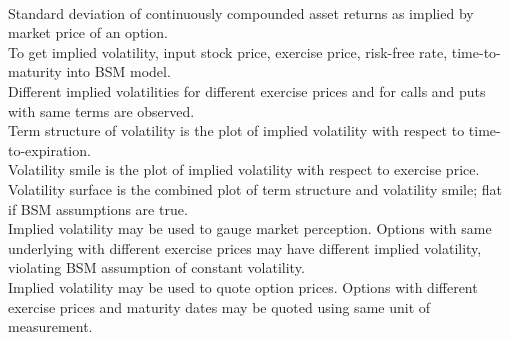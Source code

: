 \begin{remark} \\
Standard deviation of continuously compounded asset returns as implied by market price of an option.\\
To get implied volatility, input stock price, exercise price, risk-free rate, time-to-maturity into BSM model.\\
Different implied volatilities for different exercise prices and for calls and puts with same terms are observed.\\
Term structure of volatility is the plot of implied volatility with respect to time-to-expiration.\\
Volatility smile is the plot of implied volatility with respect to exercise price.\\
Volatility surface is the combined plot of term structure and volatility smile; flat if BSM assumptions are true.\\
Implied volatility may be used to gauge market perception. Options with same underlying with different exercise prices may have different implied volatility, violating BSM assumption of constant volatility.\\
Implied volatility may be used to quote option prices. Options with different exercise prices and maturity dates may be quoted using same unit of measurement.
\end{remark}